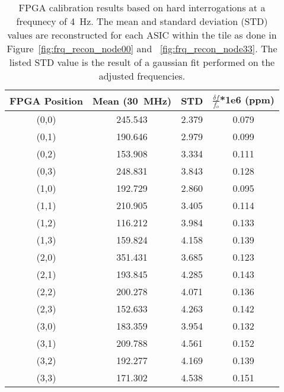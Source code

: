 \begin{table}
	\begin{center}
		\begin{tabular}{|c|c|c|c|}
			\hline
			FPGA Position & Mean (30~\unit{MHz}) & STD & $\frac{\delta f}{f_{o}}$*1e6 (ppm) \\
			\hline
			(0,0) & 245.543 & 2.379 & 0.079 \\
			\hline
			(0,1) & 190.646 & 2.979 & 0.099 \\
			\hline
			(0,2) & 153.908 & 3.334 & 0.111 \\
			\hline
			(0,3) & 248.831 & 3.843 & 0.128 \\
			\hline
			(1,0) & 192.729 & 2.860 & 0.095 \\
			\hline
			(1,1) & 210.905 & 3.405 & 0.114 \\
			\hline
			(1,2) & 116.212 & 3.984 & 0.133 \\
			\hline
			(1,3) & 159.824 & 4.158 & 0.139 \\
			\hline
			(2,0) & 351.431 & 3.685 & 0.123 \\
			\hline
			(2,1) & 193.845 & 4.285 & 0.143 \\
			\hline
			(2,2) & 200.278 & 4.071 & 0.136 \\
			\hline
			(2,3) & 152.633 & 4.263 & 0.142 \\
			\hline
			(3,0) & 183.359 & 3.954 & 0.132 \\
			\hline
			(3,1) & 209.788 & 4.561 & 0.152 \\
			\hline
			(3,2) & 192.277 & 4.169 & 0.139 \\
			\hline
			(3,3) & 171.302 & 4.538 & 0.151 \\
			\hline
		\end{tabular}
	\end{center}
	\caption{FPGA calibration results based on hard interrogations at a frequnecy of 4~\unit{Hz}.
	The mean and standard deviation (STD) values are reconstructed for each ASIC within the tile as done in Figure~\ref{fig:frq_recon_node00} and ~\ref{fig:frq_recon_node33}.
	The listed STD value is the result of a gaussian fit performed on the adjusted frequencies.
	}
	\label{tab:fpga_calibration}
\end{table}